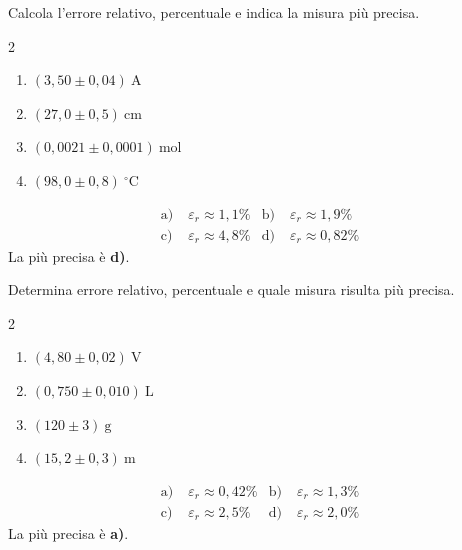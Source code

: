 \begin{question}[ID=4.2, subtitle={Errore relativo su corrente, lunghezza, mol, temperatura}, tags={errori, misure}, difficulty=media]
Calcola l'errore relativo, percentuale e indica la misura più precisa.
\begin{center}\begin{minipage}{0.92\linewidth}
\begin{multicols}{2}
\begin{enumerate}[label=\alph*),leftmargin=1.8cm]
\item $(3{,}50 \pm 0{,}04)\ \text{A}$
\item $(27{,}0 \pm 0{,}5)\ \text{cm}$
\item $(0{,}0021 \pm 0{,}0001)\ \text{mol}$
\item $(98{,}0 \pm 0{,}8)\ ^\circ\text{C}$
\end{enumerate}
\end{multicols}
\end{minipage}\end{center}
\begin{solution}
\begin{align*}
\text{a)}\; &\varepsilon_r \approx 1{,}1\% &
\text{b)}\; &\varepsilon_r \approx 1{,}9\% \\
\text{c)}\; &\varepsilon_r \approx 4{,}8\% &
\text{d)}\; &\varepsilon_r \approx 0{,}82\%
\end{align*}
La più precisa è \textbf{d)}.
\end{solution}
\end{question}

\begin{question}[ID=4.3, subtitle={Errore relativo su tensione, volume, massa, distanza}, tags={errori, misure}, difficulty=media]
Determina errore relativo, percentuale e quale misura risulta più precisa.
\begin{center}\begin{minipage}{0.92\linewidth}
\begin{multicols}{2}
\begin{enumerate}[label=\alph*),leftmargin=1.8cm]
\item $(4{,}80 \pm 0{,}02)\ \text{V}$
\item $(0{,}750 \pm 0{,}010)\ \text{L}$
\item $(120 \pm 3)\ \text{g}$
\item $(15{,}2 \pm 0{,}3)\ \text{m}$
\end{enumerate}
\end{multicols}
\end{minipage}\end{center}
\begin{solution}
\begin{align*}
\text{a)}\; &\varepsilon_r \approx 0{,}42\% &
\text{b)}\; &\varepsilon_r \approx 1{,}3\% \\
\text{c)}\; &\varepsilon_r \approx 2{,}5\% &
\text{d)}\; &\varepsilon_r \approx 2{,}0\%
\end{align*}
La più precisa è \textbf{a)}.
\end{solution}
\end{question}

